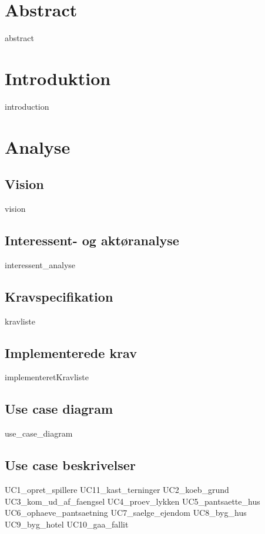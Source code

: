 \documentclass{article}
\begin{document}
{\selectfont

\thispagestyle{empty}
\newpage

\thispagestyle{empty}
\newpage
\section*{Abstract}
{abstract}
\thispagestyle{empty}
\newpage
\tableofcontents
\thispagestyle{empty}
\newpage
\clearpage
\setcounter{page}{1}

\section{Introduktion}
{introduction}

\section{Analyse}
\subsection{Vision}
{vision}

\subsection{Interessent- og aktøranalyse}
{interessent_analyse}
\subsection{Kravspecifikation}
{kravliste}
\subsection{Implementerede krav}
{implementeretKravliste}
\newpage
\subsection{Use case diagram}
{use_case_diagram}
\newpage
\subsection{Use case beskrivelser}
{UC1_opret_spillere}
{UC11_kast_terninger}
{UC2_koeb_grund}
{UC3_kom_ud_af_faengsel}
{UC4_proev_lykken}
{UC5_pantsaette_hus}
{UC6_ophaeve_pantsaetning}
{UC7_saelge_ejendom}
{UC8_byg_hus}
{UC9_byg_hotel}
{UC10_gaa_fallit}
\newpage
}
\end{document}
